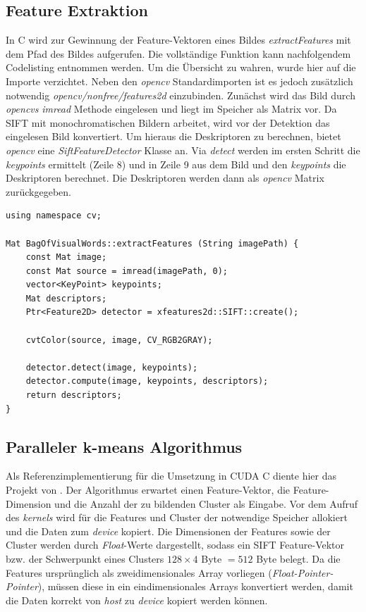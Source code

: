 \subsection{Feature Extraktion} 

In C wird zur Gewinnung der Feature-Vektoren eines Bildes \textit{extractFeatures} mit dem Pfad des Bildes aufgerufen. Die vollständige Funktion kann nachfolgendem Codelisting entnommen werden. Um die Übersicht zu wahren, wurde hier auf die Importe verzichtet. Neben den \textit{opencv} Standardimporten ist es jedoch zusätzlich notwendig \textit{opencv/nonfree/features2d} einzubinden. Zunächst wird das Bild durch \textit{opencvs} \textit{imread} Methode eingelesen und liegt im Speicher als Matrix vor. Da SIFT mit monochromatischen Bildern arbeitet, wird vor der Detektion das eingelesen Bild konvertiert. Um hieraus die Deskriptoren zu berechnen, bietet \textit{opencv} eine \textit{SiftFeatureDetector} Klasse an. Via \textit{detect} werden im ersten Schritt die \textit{keypoints} ermittelt (Zeile 8) und in Zeile 9 aus dem Bild und den \textit{keypoints} die Deskriptoren berechnet. Die Deskriptoren werden dann als \textit{opencv} Matrix zurückgegeben.

\lstset{language=C}
\begin{lstlisting}
using namespace cv;

Mat BagOfVisualWords::extractFeatures (String imagePath) {
	const Mat image;
	const Mat source = imread(imagePath, 0);
	vector<KeyPoint> keypoints;
	Mat descriptors;	
	Ptr<Feature2D> detector = xfeatures2d::SIFT::create();
	
	cvtColor(source, image, CV_RGB2GRAY);
	
	detector.detect(image, keypoints);
	detector.compute(image, keypoints, descriptors);
	return descriptors;
}
\end{lstlisting}

\subsection{Paralleler k-means Algorithmus}

Als Referenzimplementierung für die Umsetzung in CUDA C diente hier das Projekt von \todo{[REF]}. Der Algorithmus erwartet einen Feature-Vektor, die Feature-Dimension und die Anzahl der zu bildenden Cluster als Eingabe. Vor dem Aufruf des \textit{kernels} wird für die Features und Cluster der notwendige Speicher allokiert und die Daten zum \textit{device} kopiert. Die Dimensionen der Features sowie der Cluster werden durch \textit{Float}-Werte dargestellt, sodass ein SIFT Feature-Vektor bzw. der Schwerpunkt eines Clusters $128 \times 4$ Byte $= 512$ Byte belegt. Da die Features ursprünglich als zweidimensionales Array vorliegen (\textit{Float-Pointer-Pointer}), müssen diese in ein eindimensionales Arrays konvertiert werden, damit die Daten korrekt von \textit{host} zu \textit{device} kopiert werden können. 

